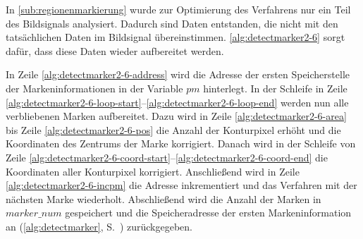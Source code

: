 

In \autoref{sub:regionenmarkierung} wurde zur Optimierung des Verfahrens nur ein Teil des Bildsignals analysiert.
 Dadurch sind Daten entstanden, die nicht mit den tatsächlichen Daten im Bildsignal übereinstimmen.
 \autoref{alg:detectmarker2-6} sorgt dafür, dass diese Daten wieder aufbereitet werden.



In Zeile \ref{alg:detectmarker2-6-address} wird die Adresse der ersten Speicherstelle der Markeninformationen in der
 Variable $\mathit{pm}$ hinterlegt. In der Schleife in Zeile
 \ref{alg:detectmarker2-6-loop-start}--\ref{alg:detectmarker2-6-loop-end} werden nun alle verbliebenen Marken
 aufbereitet. Dazu wird in Zeile \ref{alg:detectmarker2-6-area} bis Zeile \ref{alg:detectmarker2-6-pos} die Anzahl der
 Konturpixel erhöht und die Koordinaten des Zentrums der Marke korrigiert. Danach wird in der Schleife von Zeile
 \ref{alg:detectmarker2-6-coord-start}--\ref{alg:detectmarker2-6-coord-end} die Koordinaten aller Konturpixel
 korrigiert. Anschließend wird in Zeile \ref{alg:detectmarker2-6-incpm} die Adresse inkrementiert und das Verfahren mit
 der nächsten Marke wiederholt. Abschließend wird die Anzahl der Marken in $\mathit{marker\_num}$ gespeichert und die
 Speicheradresse der ersten Markeninformation an  (\autoref{alg:detectmarker},
 S.~\pageref{alg:detectmarker}) zurückgegeben.